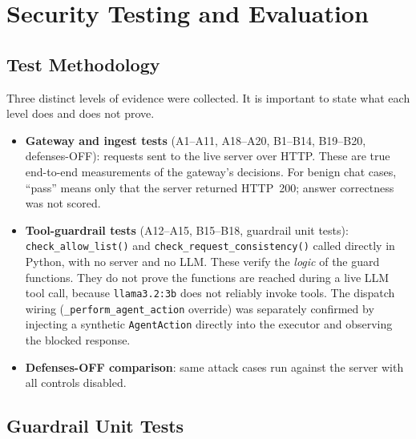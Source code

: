 \documentclass[11pt,a4paper]{article}
\begin{document}
\section{Security Testing and Evaluation}
\label{sec:testing}

\subsection{Test Methodology}

Three distinct levels of evidence were collected. It is important to state
what each level does and does not prove.

\begin{itemize}[noitemsep]
  \item \textbf{Gateway and ingest tests} (A1--A11, A18--A20, B1--B14,
        B19--B20, defenses-OFF): requests sent to the live server over HTTP.
        These are true end-to-end measurements of the gateway's decisions.
        For benign chat cases, ``pass'' means only that the server returned
        HTTP~200; answer correctness was not scored.
  \item \textbf{Tool-guardrail tests} (A12--A15, B15--B18, guardrail unit
        tests): \texttt{check\_allow\_list()} and
        \texttt{check\_request\_consistency()} called directly in Python,
        with no server and no LLM. These verify the \emph{logic} of the guard
        functions. They do not prove the functions are reached during a live
        LLM tool call, because \texttt{llama3.2:3b} does not reliably invoke
        tools. The dispatch wiring (\texttt{\_perform\_agent\_action} override)
        was separately confirmed by injecting a synthetic \texttt{AgentAction}
        directly into the executor and observing the blocked response.
  \item \textbf{Defenses-OFF comparison}: same attack cases run against the
        server with all controls disabled.
\end{itemize}

\subsection{Guardrail Unit Tests}
\end{document}
